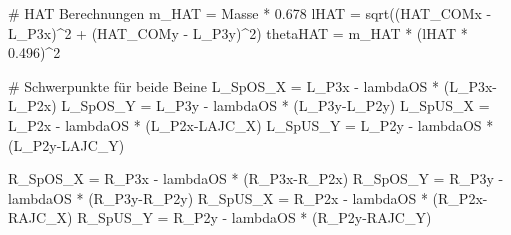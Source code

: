 \documentclass[
  letterpaper,
  DIV=11]{scrartcl}
\newenvironment{Shaded}{\begin{snugshade}}{\end{snugshade}}
\newcommand{\CommentTok}[1]{\textcolor[rgb]{0.37,0.37,0.37}{#1}}
\newcommand{\DecValTok}[1]{\textcolor[rgb]{0.68,0.00,0.00}{#1}}
\newcommand{\FloatTok}[1]{\textcolor[rgb]{0.68,0.00,0.00}{#1}}
\newcommand{\FunctionTok}[1]{\textcolor[rgb]{0.28,0.35,0.67}{#1}}
\newcommand{\NormalTok}[1]{\textcolor[rgb]{0.00,0.23,0.31}{#1}}
\newcommand{\OtherTok}[1]{\textcolor[rgb]{0.00,0.23,0.31}{#1}}
\newcommand{\SpecialCharTok}[1]{\textcolor[rgb]{0.37,0.37,0.37}{#1}}
\begin{document}
\begin{Shaded}
\begin{Highlighting}[]
\CommentTok{\# HAT Berechnungen}
\NormalTok{m\_HAT }\OtherTok{=}\NormalTok{ Masse }\SpecialCharTok{*} \FloatTok{0.678}
\NormalTok{lHAT }\OtherTok{=} \FunctionTok{sqrt}\NormalTok{((HAT\_COMx }\SpecialCharTok{{-}}\NormalTok{ L\_P3x)}\SpecialCharTok{\^{}}\DecValTok{2} \SpecialCharTok{+}\NormalTok{ (HAT\_COMy }\SpecialCharTok{{-}}\NormalTok{ L\_P3y)}\SpecialCharTok{\^{}}\DecValTok{2}\NormalTok{)}
\NormalTok{thetaHAT }\OtherTok{=}\NormalTok{ m\_HAT }\SpecialCharTok{*}\NormalTok{ (lHAT }\SpecialCharTok{*} \FloatTok{0.496}\NormalTok{)}\SpecialCharTok{\^{}}\DecValTok{2}

\CommentTok{\# Schwerpunkte für beide Beine}
\NormalTok{L\_SpOS\_X }\OtherTok{=}\NormalTok{ L\_P3x }\SpecialCharTok{{-}}\NormalTok{ lambdaOS }\SpecialCharTok{*}\NormalTok{ (L\_P3x}\SpecialCharTok{{-}}\NormalTok{L\_P2x)}
\NormalTok{L\_SpOS\_Y }\OtherTok{=}\NormalTok{ L\_P3y }\SpecialCharTok{{-}}\NormalTok{ lambdaOS }\SpecialCharTok{*}\NormalTok{ (L\_P3y}\SpecialCharTok{{-}}\NormalTok{L\_P2y)}
\NormalTok{L\_SpUS\_X }\OtherTok{=}\NormalTok{ L\_P2x }\SpecialCharTok{{-}}\NormalTok{ lambdaOS }\SpecialCharTok{*}\NormalTok{ (L\_P2x}\SpecialCharTok{{-}}\NormalTok{LAJC\_X)}
\NormalTok{L\_SpUS\_Y }\OtherTok{=}\NormalTok{ L\_P2y }\SpecialCharTok{{-}}\NormalTok{ lambdaOS }\SpecialCharTok{*}\NormalTok{ (L\_P2y}\SpecialCharTok{{-}}\NormalTok{LAJC\_Y)}

\NormalTok{R\_SpOS\_X }\OtherTok{=}\NormalTok{ R\_P3x }\SpecialCharTok{{-}}\NormalTok{ lambdaOS }\SpecialCharTok{*}\NormalTok{ (R\_P3x}\SpecialCharTok{{-}}\NormalTok{R\_P2x)}
\NormalTok{R\_SpOS\_Y }\OtherTok{=}\NormalTok{ R\_P3y }\SpecialCharTok{{-}}\NormalTok{ lambdaOS }\SpecialCharTok{*}\NormalTok{ (R\_P3y}\SpecialCharTok{{-}}\NormalTok{R\_P2y)}
\NormalTok{R\_SpUS\_X }\OtherTok{=}\NormalTok{ R\_P2x }\SpecialCharTok{{-}}\NormalTok{ lambdaOS }\SpecialCharTok{*}\NormalTok{ (R\_P2x}\SpecialCharTok{{-}}\NormalTok{RAJC\_X)}
\NormalTok{R\_SpUS\_Y }\OtherTok{=}\NormalTok{ R\_P2y }\SpecialCharTok{{-}}\NormalTok{ lambdaOS }\SpecialCharTok{*}\NormalTok{ (R\_P2y}\SpecialCharTok{{-}}\NormalTok{RAJC\_Y)}


\end{Highlighting}
\end{Shaded}
\end{document}
